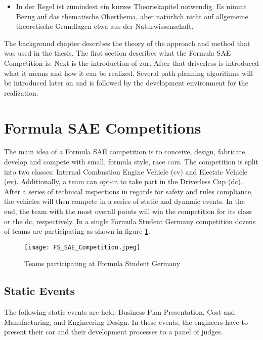 \begin{itemize}
    \item In der Regel ist zumindest ein kurzes Theoriekapitel notwendig. Es nimmt Bezug auf das thematische Oberthema, aber natürlich nicht auf allgemeine theoretische Grundlagen etwa aus der Naturwissenschaft.
\end{itemize}
The background chapter describes the theory of the approach and method that was used in the thesis. The first section describes what the Formula SAE Competition is. Next is the introduction of \acrlong{zur}. After that driverless is introduced what it means and how it can be realized. Several path planning algorithms will be introduced later on and is followed by the development environment for the realization.

\section{Formula SAE Competitions} \label{sec:Formula SAE Competitions}
The main idea of a Formula SAE competition is to conceive, design, fabricate, develop and compete with small, formula style, race cars.
The competition is split into two classes: Internal Combustion Engine Vehicle (\acrshort{cv}) and Electric Vehicle (\acrshort{ev}).
Additionally, a team can opt-in to take part in the Driverless Cup (\acrshort{dc}).
After a series of technical inspections in regards for safety and rules compliance, the vehicles will then compete in a series of static and dynamic events. In the end, the team with the most overall points will win the competition for its class or the \acrlong{dc}, respectively. \cite{fs_rules_2022_handbook}
In a single Formula Student Germany competition dozens of teams are participating as shown in figure \ref{fig:FS SAE Competition}.
\begin{figure}[H]
    \centering
    \texttt{[image: FS\_SAE\_Competition.jpeg]}
    \caption{Teams participating at Formula Student Germany \cite{fs_germany}}
    \label{fig:FS SAE Competition}
\end{figure}

\subsection{Static Events} \label{sec:Static Events}
The following static events are held: Business Plan Presentation, Cost and Manufacturing, and Engineering Design. In these events, the engineers have to present their car and their development processes to a panel of judges. \cite{fs_rules_2022_handbook}

